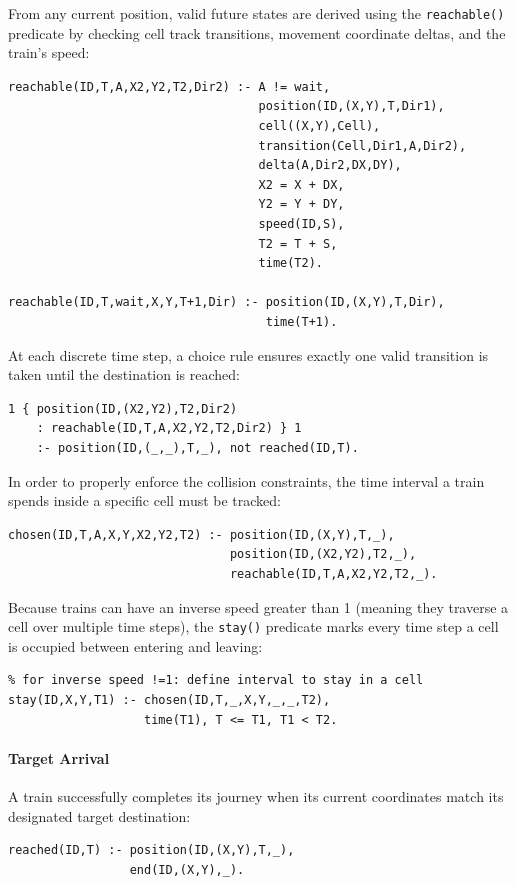 \documentclass[12pt, a4paper]{llncs}
\begin{document}
From any current position, valid future states are derived using the \texttt{reachable()} predicate by checking cell track transitions, movement coordinate deltas, and the train's speed:
\begin{verbatim}
reachable(ID,T,A,X2,Y2,T2,Dir2) :- A != wait,
                                   position(ID,(X,Y),T,Dir1),
                                   cell((X,Y),Cell),
                                   transition(Cell,Dir1,A,Dir2),
                                   delta(A,Dir2,DX,DY),
                                   X2 = X + DX,
                                   Y2 = Y + DY,
                                   speed(ID,S),
                                   T2 = T + S,
                                   time(T2).
                                   
reachable(ID,T,wait,X,Y,T+1,Dir) :- position(ID,(X,Y),T,Dir),
                                    time(T+1).
\end{verbatim}

At each discrete time step, a choice rule ensures exactly one valid transition is taken until the destination is reached:
\begin{verbatim}
1 { position(ID,(X2,Y2),T2,Dir2) 
    : reachable(ID,T,A,X2,Y2,T2,Dir2) } 1 
    :- position(ID,(_,_),T,_), not reached(ID,T).
\end{verbatim}

In order to properly enforce the collision constraints, the time interval a train spends inside a specific cell must be tracked:
\begin{verbatim}
chosen(ID,T,A,X,Y,X2,Y2,T2) :- position(ID,(X,Y),T,_),
                               position(ID,(X2,Y2),T2,_),
                               reachable(ID,T,A,X2,Y2,T2,_).
\end{verbatim}

Because trains can have an inverse speed greater than 1 (meaning they traverse a cell over multiple time steps), the \texttt{stay()} predicate marks every time step a cell is occupied between entering and leaving:
\begin{verbatim}
% for inverse speed !=1: define interval to stay in a cell
stay(ID,X,Y,T1) :- chosen(ID,T,_,X,Y,_,_,T2),
                   time(T1), T <= T1, T1 < T2.
\end{verbatim}

\paragraph{Target Arrival}
A train successfully completes its journey when its current coordinates match its designated target destination:
\begin{verbatim}
reached(ID,T) :- position(ID,(X,Y),T,_),
                 end(ID,(X,Y),_). 
\end{verbatim}
\end{document}
